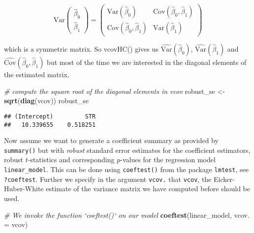 \documentclass[]{book}
\newenvironment{Shaded}{\begin{snugshade}}{\end{snugshade}}
\newcommand{\KeywordTok}[1]{\textcolor[rgb]{0.13,0.29,0.53}{\textbf{#1}}}
\newcommand{\DataTypeTok}[1]{\textcolor[rgb]{0.13,0.29,0.53}{#1}}
\newcommand{\StringTok}[1]{\textcolor[rgb]{0.31,0.60,0.02}{#1}}
\newcommand{\CommentTok}[1]{\textcolor[rgb]{0.56,0.35,0.01}{\textit{#1}}}
\newcommand{\NormalTok}[1]{#1}
\theoremstyle{definition}
\theoremstyle{definition}
\theoremstyle{definition}
\theoremstyle{remark}
\begin{document}
\begin{equation}
\text{Var}
  \begin{pmatrix}
    \hat\beta_0 \\
    \hat\beta_1
  \end{pmatrix} = 
\begin{pmatrix}
  \text{Var}(\hat\beta_0) & \text{Cov}(\hat\beta_0,\hat\beta_1) \\
\text{Cov}(\hat\beta_0,\hat\beta_1) & \text{Var}(\hat\beta_1)
\end{pmatrix}
\end{equation}

which is a symmetric matrix. So vcovHC() gives us
\(\widehat{\text{Var}}(\hat\beta_0)\),
\(\widehat{\text{Var}}(\hat\beta_1)\) and
\(\widehat{\text{Cov}}(\hat\beta_0,\hat\beta_1)\) but most of the time
we are interested in the diagonal elements of the estimated matrix.

\begin{Shaded}
\begin{Highlighting}[]
\CommentTok{# compute the square root of the diagonal elements in vcov}
\NormalTok{robust_se <-}\StringTok{ }\KeywordTok{sqrt}\NormalTok{(}\KeywordTok{diag}\NormalTok{(vcov))}
\NormalTok{robust_se}
\end{Highlighting}
\end{Shaded}

\begin{verbatim}
## (Intercept)         STR 
##   10.339655    0.518251
\end{verbatim}

Now assume we want to generate a coefficient summary as provided by
\texttt{summary()} but with \emph{robust} standard error estimates for
the coefficient estimators, robust \(t\)-statistics and corresponding
\(p\)-values for the regression model \texttt{linear\_model}. This can
be done using \texttt{coeftest()} from the package \texttt{lmtest}, see
\texttt{?coeftest}. Further we specify in the argument \texttt{vcov.}
that \texttt{vcov}, the Eicker-Huber-White estimate of the variance
matrix we have computed before should be used.

\begin{Shaded}
\begin{Highlighting}[]
\CommentTok{# We invoke the function `coeftest()` on our model}
\KeywordTok{coeftest}\NormalTok{(linear_model, }\DataTypeTok{vcov. =}\NormalTok{ vcov)}
\end{Highlighting}
\end{Shaded}
\end{document}
